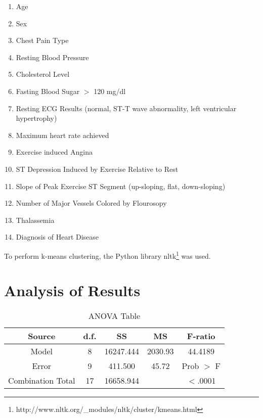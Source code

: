\documentclass[times]{article}
\begin{document}
   \begin{enumerate}
      \itemsep0em
      \item Age
      \item Sex
      \item Chest Pain Type
      \item Resting Blood Pressure
      \item Cholesterol Level
      \item Fasting Blood Sugar $>$ 120 mg/dl
      \item Resting ECG Results (normal, ST-T wave abnormality, left ventricular hypertrophy)
      \item Maximum heart rate achieved
      \item Exercise induced Angina
      \item ST Depression Induced by Exercise Relative to Rest
      \item Slope of Peak Exercise ST Segment (up-sloping, flat, down-sloping)
      \item Number of Major Vessels Colored by Flourosopy
      \item Thalassemia
      \item Diagnosis of Heart Disease
   \end{enumerate}

   To perform k-means clustering, the Python library 
   nltk\footnote{http://www.nltk.org/\_modules/nltk/cluster/kmeans.html} was used.

   \section{Analysis of Results}

   \begin{table}[H]
      \centering
      \caption{ANOVA Table}
      \label{tab:anova}
      \begin{tabular}{| c | c | c | c | c |}
         \hline
         Source              & d.f.   & SS        & MS      & F-ratio    \\
         \hline
         Model               & 8      & 16247.444 & 2030.93 & 44.4189    \\
         \hline
         Error               & 9      & 411.500   & 45.72   & Prob $>$ F \\
         \hline
         Combination Total   & 17     & 16658.944 &         & $<$.0001   \\
         \hline
      \end{tabular}
   \end{table}
\end{document}
